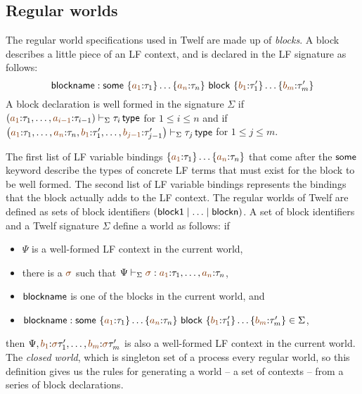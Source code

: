 \subsection{Regular worlds}
\label{sec:gen-regularworlds}

The
regular world specifications used in Twelf
\cite{schurmann00automating} are made up of {\it blocks}. A block
describes a little piece of an LF context, and is declared in the LF
signature as follows:
\[
 {\sf blockname} :
 {\sf some}~\{\lf{a_1}{:}\tau_1\}\ldots\{\lf{a_n}{:}\tau_n\}
~{\sf block}~\{\lf{b_1}{:}\tau'_1\}\ldots\{\lf{b_m}{:}\tau'_m\}
\]
A block declaration is well formed in the signature $\Sigma$ if 
$\left(\lf{a_1}{:}\tau_1,\ldots,\lf{a_{i-1}}{:} \tau_{i-1} \right)\vdash_\Sigma
\tau_i \,{\sf type}$ for $1 \leq i \leq n$ and if 
$\left(\lf{a_1}{:}\tau_1,\ldots,\lf{a_{n}}{:} \tau_{n},
 \lf{b_1}{:}\tau'_1,\ldots,\lf{b_{j-1}}{:}\tau'_{j-1}\right) \vdash_\Sigma
\tau_j \,{\sf type}$ for $1 \leq j \leq m$. 

The first list of LF variable bindings
$\{\lf{a_1}{:}\tau_1\}\ldots\{\lf{a_n}{:}\tau_n\}$ that 
come after the ${\sf some}$ keyword describe the types
of concrete LF terms that must exist for the block to be well formed.
The second list of LF variable bindings represents the bindings that
the block actually adds to the LF context. The regular worlds of 
Twelf are defined as sets of block identifiers 
$({\sf block1} \mid \ldots \mid {\sf blockn})$. A set of block identifiers
and a Twelf signature $\Sigma$ define a world as follows: if
\smallskip
\begin{itemize}
\item $\Psi$ is a well-formed
LF context in the current world, 
\item there is a $\lf{\sigma}$ such that
$\Psi \vdash_\Sigma \lf{\sigma} :
\lf{a_1}{:}\tau_1,\ldots,\lf{a_n}{:}\tau_n$, 
\item ${\sf blockname}$ is one of the blocks in the current world, and
\item ${\sf blockname} :
 {\sf some}~\{\lf{a_1}{:}\tau_1\}\ldots\{\lf{a_n}{:}\tau_n\}
~{\sf block}~\{\lf{b_1}{:}\tau'_1\}\ldots\{\lf{b_m}{:}\tau'_m\} \in \Sigma$,
\end{itemize}
\smallskip then $\Psi, \lf{b_1}{:}\lf\sigma\tau'_1,\ldots,
\lf{b_m}{:}\lf\sigma\tau'_m$ is also a well-formed LF context in the
current world. The {\it closed world}, which is singleton set of a
process every regular world, so this definition gives us the rules for
generating a world -- a set of contexts -- from a series of block
declarations.

